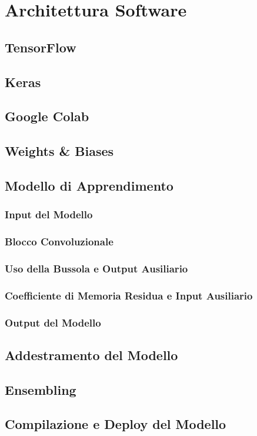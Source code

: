 \documentclass[12pt]{report}
\begin{document}
\chapter{Architettura Software}
\section{TensorFlow}
\section{Keras}
\section{Google Colab}
\section{Weights \& Biases}
\section{Modello di Apprendimento}
\subsection{Input del Modello}
\subsection{Blocco Convoluzionale}
\subsection{Uso della Bussola e Output Ausiliario}
\subsection{Coefficiente di Memoria Residua e Input Ausiliario}
\subsection{Output del Modello}
\section{Addestramento del Modello}
\section{Ensembling}
\section{Compilazione e Deploy del Modello}
\end{document}
